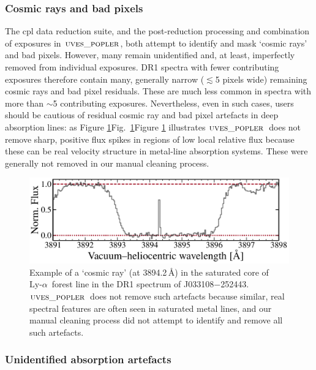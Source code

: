 \documentclass[fleqn,usenatbib,usedcolumn]{mnras}
\renewcommand{\la}{\lesssim} %
\newcommand{\Fref}[1]{\ifhmode \ifnum\spacefactor=1001 Figure \ref{#1}\else Fig.\ \ref{#1}\fi \else Figure \ref{#1}\fi}
\newcommand{\lya}{\ensuremath{\textrm{Ly-}\alpha}}
\newcommand{\popler}{\ensuremath{\textsc{uves\_popler}}}
\begin{document}
\subsubsection{Cosmic rays and bad pixels}\label{sss:cosmic}

The {\sc cpl} data reduction suite, and the post-reduction processing and combination of exposures in \popler, both attempt to identify and mask `cosmic rays' and bad pixels. However, many remain unidentified and, at least, imperfectly removed from individual exposures. DR1 spectra with fewer contributing exposures therefore contain many, generally narrow ($\la$5 pixels wide) remaining cosmic rays and bad pixel residuals. These are much less common in spectra with more than $\sim$5 contributing exposures. Nevertheless, even in such cases, users should be cautious of residual cosmic ray and bad pixel artefacts in deep absorption lines: as \Fref{f:cosmic} illustrates \popler\ does not remove sharp, positive flux spikes in regions of low local relative flux because these can be real velocity structure in metal-line absorption systems. These were generally not removed in our manual cleaning process.

\begin{figure}
\begin{center}
\includegraphics[width=0.90\columnwidth]{DR1_cosmic.pdf}
\vspace{-1em}
\caption{Example of a `cosmic ray' (at 3894.2\,\AA) in the saturated core of \lya\ forest line in the DR1 spectrum of J033108$-$252443. \popler\ does not remove such artefacts because similar, real spectral features are often seen in saturated metal lines, and our manual cleaning process did not attempt to identify and remove all such artefacts.}
\label{f:cosmic}
\end{center}
\end{figure}


\subsubsection{Unidentified absorption artefacts}\label{sss:unidentified}
\end{document}
